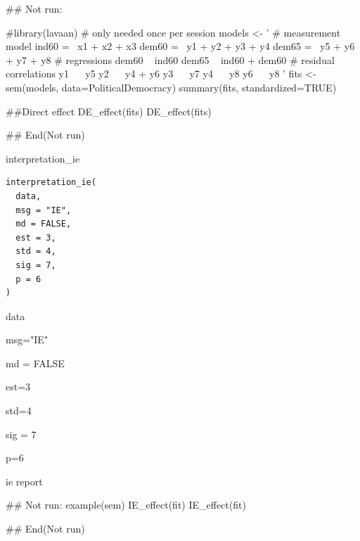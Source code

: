 \documentclass[a4paper]{book}
\begin{document}
\begin{Examples}
\begin{ExampleCode}

## Not run: 

 #library(lavaan) # only needed once per session
 models <- '
   # measurement model
     ind60 =~ x1 + x2 + x3
     dem60 =~ y1 + y2 + y3 + y4
     dem65 =~ y5 + y6 + y7 + y8
 # regressions
     dem60 ~ ind60
     dem65 ~ ind60 + dem60
   # residual correlations
     y1 ~~ y5
     y2 ~~ y4 + y6
     y3 ~~ y7
     y4 ~~ y8
    y6 ~~ y8
 '
 fits <- sem(models, data=PoliticalDemocracy)
 summary(fits, standardized=TRUE)

 ##Direct effect
 DE_effect(fits)
 DE_effect(fits)%


## End(Not run)

\end{ExampleCode}
\end{Examples}
%
\begin{Description}
interpretation\_ie
\end{Description}
%
\begin{Usage}
\begin{verbatim}
interpretation_ie(
  data,
  msg = "IE",
  md = FALSE,
  est = 3,
  std = 4,
  sig = 7,
  p = 6
)
\end{verbatim}
\end{Usage}
%
\begin{Arguments}
\begin{ldescription}
\item[\code{data}] data

\item[\code{msg}] msg="IE"

\item[\code{md}] md = FALSE

\item[\code{est}] est=3

\item[\code{std}] std=4

\item[\code{sig}] sig = 7

\item[\code{p}] p=6
\end{ldescription}
\end{Arguments}
%
\begin{Value}
ie report
\end{Value}
%
\begin{Examples}
\begin{ExampleCode}

## Not run: 
example(sem)
IE_effect(fit)
IE_effect(fit) %

## End(Not run)
\end{ExampleCode}
\end{Examples}
\end{document}
